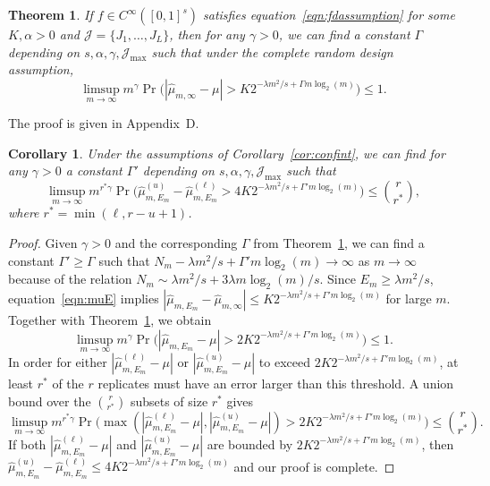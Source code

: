 \documentclass{article}
\newtheorem{theorem}{Theorem}
\newtheorem{corollary}{Corollary}
\theoremstyle{definition}
\renewcommand{\leq}{\leqslant}
\renewcommand{\geq}{\geqslant}
\newcommand{\cj}{\mathcal{J}}
\newcommand{\appD}{D}
\begin{document}
    \begin{theorem}\label{thm:superpoly}
        If $f\in C^{\infty}([0,1]^s)$ satisfies equation~\eqref{eqn:fdassumption} for some $K,\alpha>0$ and $\cj=\{J_1,\dots,J_L\}$, then for any $\gamma>0$, we can find a constant $\Gamma$ depending on $s,\alpha,\gamma,\cj_{\max}$ such that under the complete random design assumption,
        $$\limsup_{m\to\infty} m^{\gamma} \Pr\Big(|\hat{\mu}_{m,\infty}-\mu|> K2^{-\lambda m^2/s+\Gamma m\log_2(m)}\Big)\leq 1.$$
    \end{theorem}

    The proof is given in Appendix~\appD.
    

    \begin{corollary}\label{cor:superpoly}
        Under the assumptions of Corollary~\ref{cor:confint}, we can find for any $\gamma>0$ a constant $\Gamma'$ depending on $s,\alpha,\gamma,\cj_{\max}$ such that
        $$\limsup_{m\to\infty} m^{r^*\gamma }\Pr\Big(\hat{\mu}^{(u)}_{m,E_m}-\hat{\mu}^{(\ell)}_{m,E_m}> 4K2^{-\lambda m^2/s+\Gamma' m\log_2(m)}\Big)\leq \binom{r}{r^*},$$
        where $r^*=\min(\ell,r-u+1)$. 
    \end{corollary}
    \begin{proof}
    Given $\gamma>0$ and the corresponding $\Gamma$ from Theorem~\ref{thm:superpoly}, we can find a constant $\Gamma'\geq \Gamma$ such that $N_m-\lambda m^2/s+\Gamma' m\log_2(m) \to \infty$ as $m\to\infty$ because of the relation $N_m\sim \lambda m^2/s+3\lambda m\log_2(m)/s$. Since $E_m\geq \lambda m^2/s$, equation~\eqref{eqn:muE} implies $|\hat{\mu}_{m,E_m}-\hat{\mu}_{m,\infty}|\leq K2^{-\lambda m^2/s+\Gamma' m\log_2(m)}$ for large $m$. Together with Theorem~\ref{thm:superpoly}, we obtain
    $$\limsup_{m\to\infty} m^{\gamma} \Pr\Big(|\hat{\mu}_{m,E_m}-\mu|> 2K2^{-\lambda m^2/s+\Gamma' m\log_2(m)}\Big)\leq 1.$$
    In order for either $|\hat{\mu}^{(\ell)}_{m,E_m}-\mu|$ or $|\hat{\mu}^{(u)}_{m,E_m}-\mu|$ to exceed $2K2^{-\lambda m^2/s+\Gamma' m\log_2(m)}$, at least $r^*$ of the $r$ replicates  must have an error larger than this threshold.  A union bound over the $\binom{r}{r^*}$ subsets of size $r^*$ gives
    $$\limsup_{m\to\infty} m^{r^* \gamma } \Pr\Big(\max(|\hat{\mu}^{(\ell)}_{m,E_m}-\mu|,|\hat{\mu}^{(u)}_{m,E_m}-\mu|)> 2K2^{-\lambda m^2/s+\Gamma' m\log_2(m)}\Big)\leq \binom{r}{r^*}.$$
    If both $|\hat{\mu}^{(\ell)}_{m,E_m}-\mu|$ and $|\hat{\mu}^{(u)}_{m,E_m}-\mu|$ are bounded by $2K2^{-\lambda m^2/s+\Gamma' m\log_2(m)}$, then  $\hat{\mu}^{(u)}_{m,E_m}-\hat{\mu}^{(\ell)}_{m,E_m}\leq 4K2^{-\lambda m^2/s+\Gamma' m\log_2(m)} $ and our proof is complete.
    \end{proof}
\end{document}
